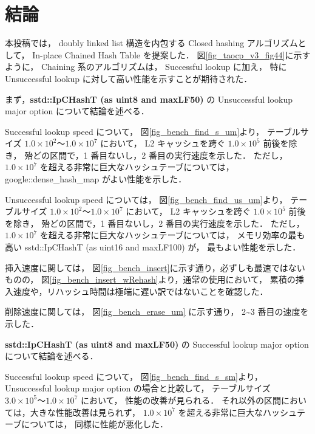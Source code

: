 \chapter{結論}
\label{chap_Conclusion}


本投稿では，
doubly linked list 構造を内包する Closed hashing アルゴリズムとして，
In-place Chained Hash Table を提案した．
図\ref{fig_taocp_v3_fig44}に示すように，
Chaining 系のアルゴリズムは， Successful lookup に加え，
特に Unsuccessful lookup に対して高い性能を示すことが期待された．
\newline

まず，{\bf sstd::IpCHashT (as uint8 and maxLF50)} の Unsuccessful lookup major option について結論を述べる．

Successful lookup speed について，
図\ref{fig_bench_find_s_um}より，
テーブルサイズ $1.0\times10^2〜1.0\times10^7$ において，
L2 キャッシュを跨ぐ $1.0\times10^5$ 前後を除き，
殆どの区間で，1 番目ないし，2 番目の実行速度を示した．
ただし，$1.0\times10^7$ を超える非常に巨大なハッシュテーブについては，
google::dense\_hash\_map がよい性能を示した．

Unsuccessful lookup speed については，
図\ref{fig_bench_find_us_um}より，
テーブルサイズ $1.0\times10^2〜1.0\times10^7$ において，
L2 キャッシュを跨ぐ $1.0\times10^5$ 前後を除き，
殆どの区間で，1 番目ないし，2 番目の実行速度を示した．
ただし，$1.0\times10^7$ を超える非常に巨大なハッシュテーブについては，
メモリ効率の最も高い sstd::IpCHashT (as uint16 and maxLF100) が，
最もよい性能を示した．

挿入速度に関しては，
図\ref{fig_bench_insert}に示す通り，必ずしも最速ではないものの，
図\ref{fig_bench_insert_wRehash}より，通常の使用において，
累積の挿入速度や，リハッシュ時間は極端に遅い訳ではないことを確認した．

削除速度に関しては，
図\ref{fig_bench_erase_um} に示す通り，
2\textasciitilde 3 番目の速度を示した．
\newline

{\bf sstd::IpCHashT (as uint8 and maxLF50)} の Successful lookup major option について結論を述べる．

Successful lookup speed について，
図\ref{fig_bench_find_s_sm}より，
Unsuccessful lookup major option の場合と比較して，
テーブルサイズ $3.0\times10^5〜1.0\times10^7$ において，
性能の改善が見られる．
それ以外の区間においては，大きな性能改善は見られず，
$1.0\times10^7$ を超える非常に巨大なハッシュテーブについては，
同様に性能が悪化した．

